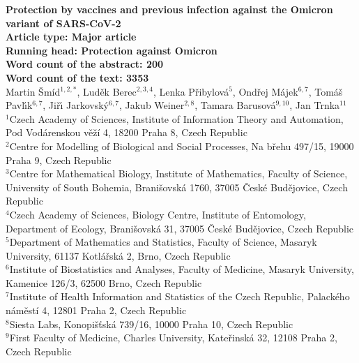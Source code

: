 \documentclass[a4paper,12pt]{article}
\begin{document}
\doublespacing

{\noindent \Large\bf Protection by vaccines and previous infection against the Omicron variant of SARS-CoV-2 \\[2ex]
{\normalsize Article type: Major article}\\[1ex]
{\normalsize Running head: Protection against Omicron}\\[1ex]
{\normalsize Word count of the abstract: 200} \\[1ex]
{\normalsize Word count of the text: 3353}}\\[2ex]
{\large Martin \v{S}m\'id$^{1,2,*}$, Lud\v{e}k Berec$^{2,3,4}$,  Lenka P\v{r}ibylov\'a$^5$, Ond\v{r}ej M\'ajek$^{6,7}$, Tom\'a\v{s} Pavl\'{\i}k$^{6,7}$, Ji\v{r}\'{\i} Jarkovsk\'y$^{6,7}$, Jakub Weiner$^{2,8}$, Tamara Barusov\'{a}$^{9,10}$, Jan Trnka$^{11}$} \\[2ex]
$^1$Czech Academy of Sciences, Institute of Information Theory and Automation, Pod Vodárenskou věží 4, 18200 Praha 8, Czech Republic \\[1ex]
$^2$Centre for Modelling of Biological and Social Processes, Na břehu 497/15, 19000 Praha 9, Czech Republic \\[1ex] 
$^3$Centre for Mathematical Biology, Institute of Mathematics, Faculty of Science,  University of South Bohemia, Branišovská 1760, 37005 České Budějovice, Czech Republic \\[1ex]
$^4$Czech Academy of Sciences, Biology Centre, Institute of Entomology, Department of Ecology, Branišovská 31, 37005 České Budějovice, Czech Republic \\[1ex]
$^5$Department of Mathematics and Statistics, Faculty of Science, Masaryk University, 61137 Kotl\'a\v{r}sk\'a 2, Brno, Czech Republic \\[1ex]
$^6$Institute of Biostatistics and Analyses, Faculty of Medicine, Masaryk University, Kamenice 126/3, 62500 Brno, Czech Republic \\[1ex]
$^7$Institute of Health Information and Statistics of the Czech Republic, Palackého náměstí 4, 12801 Praha 2, Czech Republic \\[1ex] 
$^8$Siesta Labs, Konopišťská 739/16, 10000 Praha 10, Czech Republic \\[1ex] 
$^9$First Faculty of Medicine, Charles University, Kate\v{r}inská 32, 12108 Praha 2, Czech Republic \\[1ex]
\end{document}

